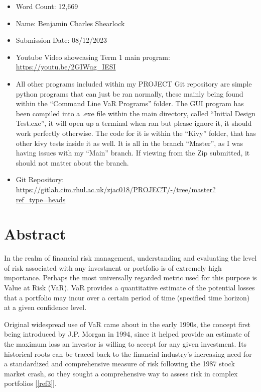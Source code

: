\documentclass{article}
\begin{document}
\begin{itemize}
  \item Word Count: 12,669
  \item Name: Benjamin Charles Shearlock
  \item Submission Date: 08/12/2023
  \item Youtube Video showcasing Term 1 main program: \url{https://youtu.be/2GIWug_IESI}
  \item All other programs included within my PROJECT Git repository are simple python programs that can just be ran normally, these mainly being found within the ``Command Line VaR Programs'' folder. The GUI program has been compiled into a .exe file within the main directory, called “Initial Design Test.exe”, it will open up a terminal when ran but please ignore it, it should work perfectly otherwise. The code for it is within the ``Kivy'' folder, that has other kivy tests inside it as well. It is all in the branch ``Master'', as I was having issues with my ``Main'' branch. If viewing from the Zip submitted, it should not matter about the branch.
  \item Git Repository: \url{https://gitlab.cim.rhul.ac.uk/zjac018/PROJECT/-/tree/master?ref_type=heads}

\end{itemize}

\newpage

\tableofcontents

\newpage

\section{Abstract}
In the realm of financial risk management, understanding and evaluating the level of risk associated with any investment or portfolio is of extremely high importance. Perhaps the most universally regarded metric used for this purpose is Value at Risk (VaR). VaR provides a quantitative estimate of the potential losses that a portfolio may incur over a certain period of time (specified time horizon) at a given confidence level. \\\vspace{0.3cm}

Original widespread use of VaR came about in the early 1990s, the concept first being introduced by J.P. Morgan in 1994, since it helped provide an estimate of the maximum loss an investor is willing to accept for any given investment. Its historical roots can be traced back to the financial industry's increasing need for a standardized and comprehensive measure of risk following the 1987 stock market crash, so they sought a comprehensive way to assess risk in complex portfolios [\ref{ref3}]. \\
\end{document}
